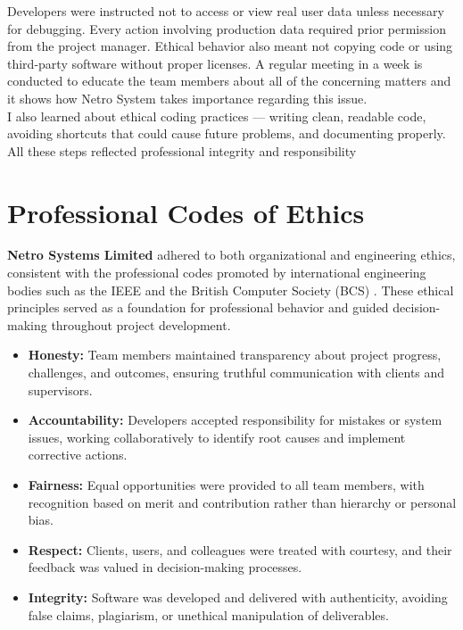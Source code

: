 \documentclass[12pt,a4paper]{report}
\newcommand{\company}[1]{\textcolor{companycolor}{\textbf{#1}}}
\let\oldcite\cite
\renewcommand{\cite}[1]{\textcolor{impactcolor}{\oldcite{#1}}}
\newenvironment{coloritemize}
{\begin{itemize}[label=\textcolor{primaryblue}{$\bullet$}]}
{\end{itemize}}
\begin{document}
Developers were instructed not to access or view real user data unless necessary for
debugging. Every action involving production data required prior permission from the
project manager. Ethical behavior also meant not copying code or using third-party
software without proper licenses. A regular meeting in a week is conducted to educate
the team members about all of the concerning matters and it shows how Netro System
takes importance regarding this issue.\\

I also learned about ethical coding practices — writing clean, readable code, avoiding
shortcuts that could cause future problems, and documenting properly. All these steps
reflected professional integrity and responsibility

\section{Professional Codes of Ethics}
\company{Netro Systems Limited} adhered to both organizational and engineering ethics, consistent with the professional codes promoted by international engineering bodies such as the IEEE \cite{ref9} and the British Computer Society (BCS) \cite{ref10}. These ethical principles served as a foundation for professional behavior and guided decision-making throughout project development.

\newpage
\begin{coloritemize}
    \item \textcolor{secondaryblue}{\textbf{Honesty:}} Team members maintained transparency about project progress, challenges, and outcomes, ensuring truthful communication with clients and supervisors.
    \item \textcolor{secondaryblue}{\textbf{Accountability:}} Developers accepted responsibility for mistakes or system issues, working collaboratively to identify root causes and implement corrective actions.
    \item \textcolor{secondaryblue}{\textbf{Fairness:}} Equal opportunities were provided to all team members, with recognition based on merit and contribution rather than hierarchy or personal bias.
    \item \textcolor{secondaryblue}{\textbf{Respect:}} Clients, users, and colleagues were treated with courtesy, and their feedback was valued in decision-making processes.
    \item \textcolor{secondaryblue}{\textbf{Integrity:}} Software was developed and delivered with authenticity, avoiding false claims, plagiarism, or unethical manipulation of deliverables.
\end{coloritemize}
\end{document}
